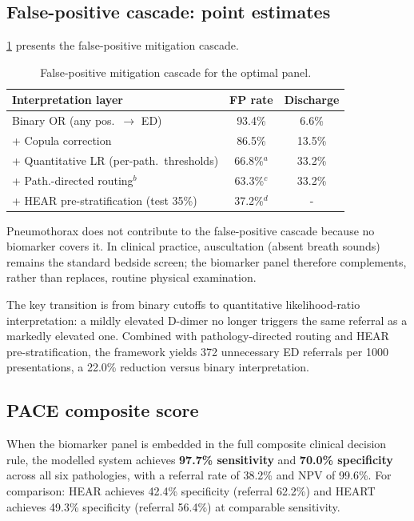 \documentclass[11pt, oneside]{article}
\begin{document}
\subsection{False-positive cascade: point estimates}

\cref{tab:fp_cascade} presents the false-positive mitigation cascade.

\begin{table}[h]
\centering
\caption{False-positive mitigation cascade for the optimal panel.}
\label{tab:fp_cascade}
\scriptsize
\setlength{\tabcolsep}{3pt}
\begin{tabular}{@{}lcc@{}}
\toprule
\textbf{Interpretation layer} & \textbf{FP rate} & \textbf{Discharge} \\
\midrule
Binary OR (any pos.\ $\to$ ED) & 93.4\% & 6.6\% \\
+ Copula correction & 86.5\% & 13.5\% \\
+ Quantitative LR (per-path.\ thresholds) & 66.8\%$^a$ & 33.2\% \\
+ Path.-directed routing$^b$ & 63.3\%$^c$ & 33.2\% \\
+ HEAR pre-stratification (test 35\%) & 37.2\%$^d$ & - \\
\bottomrule
\end{tabular}
\par{}
\end{table}

\noindent Pneumothorax does not contribute to the false-positive cascade because no biomarker covers it. In clinical practice, auscultation (absent breath sounds) remains the standard bedside screen; the biomarker panel therefore complements, rather than replaces, routine physical examination.

The key transition is from binary cutoffs to quantitative likelihood-ratio interpretation: a mildly elevated D-dimer no longer triggers the same referral as a markedly elevated one. Combined with pathology-directed routing and HEAR pre-stratification, the framework yields 372 unnecessary ED referrals per 1000 presentations, a 22.0\% reduction versus binary interpretation.

\subsection{PACE composite score}

When the biomarker panel is embedded in the full composite clinical decision rule, the modelled system achieves \textbf{97.7\% sensitivity} and \textbf{70.0\% specificity} across all six pathologies, with a referral rate of 38.2\% and NPV of 99.6\%. For comparison: HEAR achieves 42.4\% specificity (referral 62.2\%) and HEART achieves 49.3\% specificity (referral 56.4\%) at comparable sensitivity.
\end{document}
